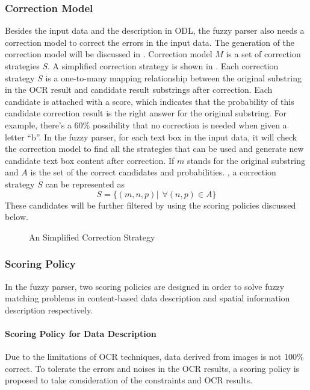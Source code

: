 \subsubsection{Correction Model}
\label{sec:corrmodel}
Besides the input data and the description in ODL, the fuzzy parser 
also needs a correction model to correct the errors in the input data. 
The generation of the correction model will be discussed in 
. Correction model $M$ is a set of correction 
strategies $S$. 
A simplified correction strategy is shown in . 
Each correction strategy $S$ is a one-to-many mapping relationship between 
the original substring in the OCR result and candidate result substrings 
after correction. Each candidate is attached with a score, 
which indicates that the probability of this candidate correction result is 
the right answer for the original substring. For example, there's a 60\% 
possibility that no correction is needed when given a letter ``b''.  
In the fuzzy parser, for each text box in the input data, it will check 
the correction model to find all the strategies that can be used 
and generate new candidate text box content after correction. 
If $m$ stands for the original substring and $A$ is the 
set of the correct candidates and probabilities. 
, a correction strategy $S$ can be represented as 
\begin{equation}
S=\{(m, n, p)|~~\forall (n, p) \in A\}
\end{equation}
These candidates will be further filtered by using the scoring policies 
discussed below. 
\begin{figure}
\centering
{}
\caption{An Simplified Correction Strategy}
\label{fig:corrstrategy}
\end{figure}

\subsubsection{Scoring Policy}
\label{sec:score}
In the fuzzy parser, two scoring policies are designed 
in order to solve fuzzy matching 
problems in content-based data description and spatial information description respectively.

\paragraph{Scoring Policy for Data Description}
Due to the limitations of OCR techniques, data derived from images is not 100\% 
correct. To tolerate the errors and noises in the OCR results, a scoring 
policy is proposed to take consideration of the constraints and OCR results. 

